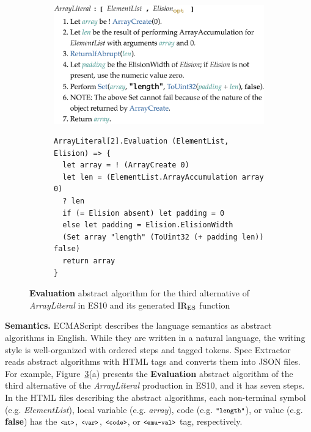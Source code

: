 \begin{figure}
  \centering
  \begin{subfigure}{0.43\textwidth}
    \includegraphics[width=\textwidth]{img/arrayliteral-eval}
    \label{fig:array-literal-eval-es}
  \end{subfigure}
  \qquad
  \begin{subfigure}{0.46\textwidth}
    \begin{lstlisting}[style=ires]
ArrayLiteral[2].Evaluation (ElementList, Elision) => {
  let array = ! (ArrayCreate 0)
  let len = (ElementList.ArrayAccumulation array 0)
  ? len
  if (= Elision absent) let padding = 0
  else let padding = Elision.ElisionWidth
  (Set array "length" (ToUint32 (+ padding len)) false)
  return array
}
    \end{lstlisting}
    \vspace*{-1em}
    \label{fig:array-literal-eval-ires}
  \end{subfigure}
  \vspace{-1em}
  \caption{\textbf{Evaluation} abstract algorithm for the third alternative of
    \textit{ArrayLiteral} in ES10 and its generated \( \text{IR}_\text{ES} \)
    function}
  \label{fig:array-literal-eval}
  \vspace{-1em}
\end{figure}

\textbf{Semantics.}
ECMAScript describes the language semantics as abstract algorithms in English.
While they are written in a natural language, the writing style is
well-organized with ordered steps and tagged tokens.  {\sf Spec Extractor}
reads abstract algorithms with HTML tags and converts them into JSON files.
For example, Figure~\ref{fig:array-literal-eval}(a) presents the
\textbf{Evaluation} abstract algorithm of the third alternative of the
\textit{ArrayLiteral} production in ES10, and it has seven steps.  In the HTML
files describing the abstract algorithms, each non-terminal symbol
(e.g. \textit{ElementList}), local variable (e.g. \textit{array}), code (e.g. \(
\texttt{\footnotesize"length"} \)), or value (e.g. \textbf{false}) has the \( \texttt{\footnotesize<nt>} \),
\( \texttt{\footnotesize<var>} \), \( \texttt{\footnotesize<code>} \), or \( \texttt{\footnotesize<emu-val>} \) tag,
respectively.

